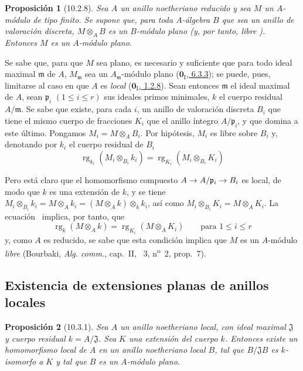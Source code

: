 \documentclass[10pt,oneside,openany]{book}
\theoremstyle{egaenv}\newtheorem*{env}{---}
\theoremstyle{egastatement}
\newtheorem*{proposition}{Proposición}
\theoremstyle{egadescription}
\renewcommand{\leq}{\leqslant}
\renewcommand{\to}{\mathchoice{\longrightarrow}{\rightarrow}{\rightarrow}{\rightarrow}}
\begin{document}
\begin{proposition}[10.2.8]
\label{0.10.2.8}
\label{0.10.2.8-fr}
Sea $A$ un anillo noetheriano reducido y sea $M$ un $A$-módulo de tipo finito.
Se supone que, para toda $A$-álgebra $B$ que sea un anillo de valoración discreta, $M\otimes_A B$ es un $B$-módulo plano (y, por tanto, libre ).
Entonces $M$ es un $A$-módulo plano.
\end{proposition}


Se sabe que, para que $M$ sea plano, es necesario y suficiente que para todo ideal maximal $\mathfrak m$ de $A$, $M_{\mathfrak m}$ sea un $A_{\mathfrak m}$-módulo plano (\hyperref[0.6.3.3-fr]{$\mathbf{0}_{\mathrm I}$, 6.3.3}); se puede, pues, limitarse al caso en que $A$ es \emph{local} (\hyperref[0.1.2.8-fr]{$\mathbf{0}_{\mathrm I}$, 1.2.8}). Sean entonces $\mathfrak m$ el ideal maximal de $A$, sean $\mathfrak p_i$
$(1\leq i\leq r)$ sus ideales primos minimales, $k$ el cuerpo residual $A/\mathfrak m$.
Se sabe  que existe, para cada $i$, un anillo de valoración discreta $B_i$ que tiene el mismo cuerpo de fracciones $K_i$ que el anillo íntegro $A/\mathfrak p_i$, y que domina a este último. Pongamos $M_i=M\otimes_A B_i$.
Por hipótesis, $M_i$ es libre sobre $B_i$ y, denotando por $k_i$ el cuerpo residual de $B_i$
\[
\label{0.10.2.8.1-fr}
  \operatorname{rg}_{k_i}(M_i\otimes_{B_i}k_i)
  =\operatorname{rg}_{K_i}(M_i\otimes_{B_i}K_i)
  \tag{10.2.8.1}
\]

Pero está claro que el homomorfismo compuesto $A\to A/\mathfrak p_i\to B_i$ es local, de modo que $k$ es una extensión de $k$,
y se tiene
$M_i\otimes_{B_i}k_i=M\otimes_A k_i=(M\otimes_A k)\otimes_k k_i$, así como $M_i\otimes_{B_i}K_i=M\otimes_A K_i$.
La ecuación~ implica, por tanto, que
\[
  \operatorname{rg}_k(M\otimes_A k)=\operatorname{rg}_{K_i}(M\otimes_A K_i)
  \qquad\text{para }1\leq i\leq r
\]
y, como $A$ es reducido, se sabe que esta condición implica que $M$ es un $A$-módulo \emph{libre} (Bourbaki, \emph{Alg. comm.}, cap.~II, \textsection~3, n\textsuperscript{o}~2, prop.~7).


\subsection{Existencia de extensiones planas de anillos locales}
\label{subsection:0.10.3}
\label{subsection:0.10.3-fr}

\begin{proposition}[10.3.1]
\label{0.10.3.1}
\label{0.10.3.1-fr}
Sea $A$ un anillo noetheriano local, con ideal maximal $\mathfrak J$ y cuerpo residual $k=A/\mathfrak J$.
Sea $K$ una extensión del cuerpo $k$.
Entonces existe un homomorfismo local de $A$ en un anillo noetheriano local $B$, tal que $B/\mathfrak J B$ es $k$-isomorfo a $K$ y tal que $B$ es un $A$-módulo plano.
\end{proposition}
\end{document}
